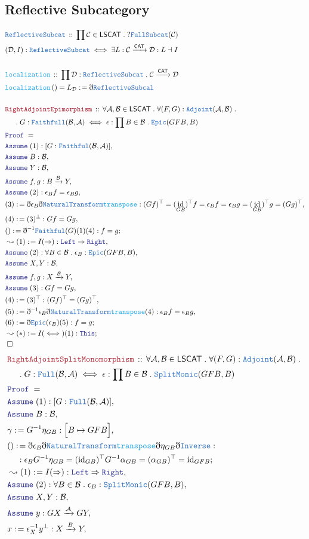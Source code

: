 \documentclass[12pt]{scrartcl}
\newcommand{\TYPE}[1]{\textcolor{NavyBlue}{\mathtt{#1}}}
\newcommand{\FUNC}[1]{\textcolor{Cerulean}{\mathtt{#1}}}
\newcommand{\LOGIC}[1]{\textcolor{Blue}{\mathtt{#1}}}
\newcommand{\THM}[1]{\textcolor{Maroon}{\mathtt{#1}}}
\renewcommand{\.}{\; . \;}
\newcommand{\de}{: \kern 0.1pc =}
\newcommand{\Act}[1]{\left( #1 \right)}
\newcommand{\Theorem}[2]{& \THM{#1} \, :: \, #2 \\ & \Proof = \\ }
\newcommand{\DeclareType}[2]{& \TYPE{#1} \, :: \, #2 \\}
\newcommand{\DefineType}[3]{& #1 : \TYPE{#2} \iff #3 \\}
\newcommand{\DeclareFunc}[2]{& \FUNC{#1} \, :: \, #2 \\}
\newcommand{\DefineNamedFunc}[4]{&  \FUNC{#1}\Act{#2} = #3 \de #4 \\}
\newcommand{\NewLine}{\\ & \kern 1pc}
\newcommand{\Page}[1]{ \begin{align*} #1 \end{align*}   }
\newcommand{ \bd }{ \ByDef }
\DeclareMathOperator*{\id}{id}
\newcommand{\Arrow}{\xrightarrow}
\newcommand{\Say}[3]{& #1 \de #2 : #3, \\}
\newcommand{\Conclude}[3]{& #1 \de #2 : #3; \\}
\newcommand{\Derive}[3]{& \leadsto #1 \de #2 : #3, \\}
\newcommand{\DeriveConclude}[3]{& \leadsto #1 \de #2 : #3 ; \\}
\newcommand{\Assume}[2]{& \LOGIC{Assume} \; #1 : #2, \\}
\newcommand{\QED}{\; \square}
\newcommand{\EndProof}{& \QED \\}
\newcommand{\ByDef}{\eth}
\newcommand{\Proof}{\LOGIC{Proof} \; }
\newcommand{\NT}{\TYPE{NaturalTransform}}
\newcommand{\C}{\mathcal{C}}
\newcommand{\A}{\mathcal{A}}
\newcommand{\B}{\mathcal{B}}
\newcommand{\D}{\mathcal{D}}
\newcommand{\CAT}{\mathsf{CAT}}
\begin{document}
\subsection{Reflective Subcategory}
\Page{
	\DeclareType{ReflectiveSubcat}{\prod \C \in \mathsf{LSCAT} \. ? \TYPE{FullSubcat}(\C)}
	\DefineType{ (\D,I)   }{ReflectiveSubcat}{ \exists L : \C \Arrow{\CAT} \D :  L \dashv I }
	\\
	\DeclareFunc{localization}{  \prod \D : \TYPE{ReflectiveSubcat} \.  \C \Arrow{\CAT} \D  }
	\DefineNamedFunc{localization}{    }{L_\D}{\bd \TYPE{ReflectiveSubcal} }
	\\
	\Theorem{RightAdjointEpimorphism}{ 
		\forall \A,\B \in \mathsf{LSCAT} \. 
		\forall (F,G) : \TYPE{Adjoint}(\A,\B) \. 
		\NewLine \.
			G : \TYPE{Faithfull}(\B,\A) \iff 
			\epsilon :  \prod B \in \B \. \TYPE{Epic}(GFB,B)
	}
	\Assume{ (1) }{[G : \TYPE{Faithful}(\B,\A)]}
	\Assume{B}{ \B }
	\Assume{Y}{\B}
	\Assume{f,g}{  B \Arrow{\B} Y   }
	\Assume{(2)}{\epsilon_B f = \epsilon_B g}
	\Say{(3)}{ \bd \epsilon_B \bd \NT \FUNC{transpose}  }
	{   
		(Gf)^\top   =  (\id_{GB})^\top f  = \epsilon_B f  =  \epsilon_B g =  (\id_{GB})^\top g  = ( Gg)^\top
	} 
	\Say{(4)}{ (3)^\bot }{  Gf =  Gg      }
	\Conclude{()}{\bd^{-1} \TYPE{Faithful}(G)(1)(4)}{f = g }
	\Derive{(1)}{I(\Rightarrow)}{  \LOGIC{Left} \Rightarrow \LOGIC{Right} }
	\Assume{(2)}{  \forall B \in \B \. \epsilon_B : \TYPE{Epic}(GFB,B) }
	\Assume{X,Y}{\B}
	\Assume{f,g}{X \Arrow{\B} Y} 
	\Assume{(3)}{Gf = Gg}
	\Say{(4)}{(3)^\top}{ (Gf)^\top = (Gg)^\top  }
	\Say{(5)}{  \bd^{-1} \epsilon_B \bd \NT \FUNC{transpose}(4) }{  \epsilon_B f = \epsilon_B g }
	\Conclude{(6)}{\bd \TYPE{Epic}(\epsilon_B)(5)}{   f = g  }
	\DeriveConclude{(*)}{I(\iff)(1)}{ \LOGIC{This} }
	\EndProof
} \Page{
	\Theorem{RightAdjointSplitMonomorphism}{ 
		\forall \A,\B \in \mathsf{LSCAT} \. 
		\forall (F,G) : \TYPE{Adjoint}(\A,\B) \. 
		\NewLine \.
			G : \TYPE{Full}(\B,\A) \iff 
			\epsilon :  \prod B \in \B \. \TYPE{SplitMonic}(GFB,B) 
	}
	\Assume{(1)}{[G : \TYPE{Full}(\B,\A)]}
	\Assume{B}{\B}
	\Say{\gamma}{ G^{-1}\eta_{GB}  }{ \Big[ B \mapsto GFB \Big]}
	\Conclude{()}{   \bd \epsilon_B \bd \NT \FUNC{transpose} \bd \eta_{GB} \bd \TYPE{Inverse}    }{  
			\NewLine : 
			\epsilon_B G^{-1}\eta_{GB}  = 
			({\id}_{GB})^\top G^{-1}\alpha_{GB}  =   
			(\alpha_{GB})^\top =
			{\id}_{GFB}
		     }
	\Derive{(1)}{I(\Rightarrow)}{\LOGIC{Left} \Rightarrow \LOGIC{Right}}
	\Assume{(2)}{\forall B \in \B \.  \epsilon_B : \TYPE{SplitMonic}(GFB,B)}
	\Assume{X,Y}{\B}
	\Assume{y}{GX \Arrow{\A} GY}
	\Say{x}{ \epsilon^{-1}_X y^{\bot}  }{X \Arrow{B} Y}
}
\end{document}

